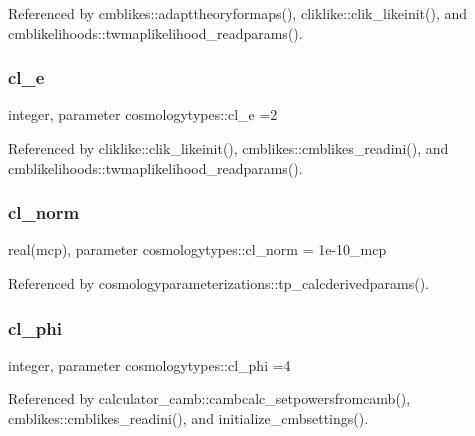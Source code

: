 Referenced by cmblikes\+::adapttheoryformaps(), cliklike\+::clik\+\_\+likeinit(), and cmblikelihoods\+::twmaplikelihood\+\_\+readparams().

\mbox{\label{namespacecosmologytypes_aded7f72c34bf738967d5fb32e4edc1e3}} 
\subsubsection{\texorpdfstring{cl\+\_\+e}{cl\_e}}
{\footnotesize\ttfamily integer, parameter cosmologytypes\+::cl\+\_\+e =2}



Referenced by cliklike\+::clik\+\_\+likeinit(), cmblikes\+::cmblikes\+\_\+readini(), and cmblikelihoods\+::twmaplikelihood\+\_\+readparams().

\mbox{\label{namespacecosmologytypes_a5f2058a68678c051e4768dd4dc91203b}} 
\subsubsection{\texorpdfstring{cl\+\_\+norm}{cl\_norm}}
{\footnotesize\ttfamily real(mcp), parameter cosmologytypes\+::cl\+\_\+norm = 1e-\/10\+\_\+mcp}



Referenced by cosmologyparameterizations\+::tp\+\_\+calcderivedparams().

\mbox{\label{namespacecosmologytypes_a25e618d45dab8f1c5092d92e772f81d0}} 
\subsubsection{\texorpdfstring{cl\+\_\+phi}{cl\_phi}}
{\footnotesize\ttfamily integer, parameter cosmologytypes\+::cl\+\_\+phi =4}



Referenced by calculator\+\_\+camb\+::cambcalc\+\_\+setpowersfromcamb(), cmblikes\+::cmblikes\+\_\+readini(), and initialize\+\_\+cmbsettings().

